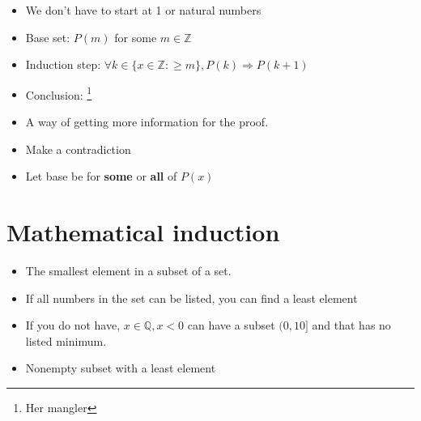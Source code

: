 \documentclass[english,10pt,a4paper]{article}
\begin{document}
\begin{theo} 
\begin{itemize}
\item We don't have to start at 1 or natural numbers
\item Base set: $P(m)$ for some $m\in \mathbb{Z}$
\item Induction step: $\forall k\in \{x \in \mathbb{Z}: \geq m \}, P(k) \Rightarrow P(k+1)$
\item Conclusion: \footnote{Her mangler}
\end{itemize}
\end{theo}


\begin{theo} 
\begin{itemize}
\item A way of getting more information for the proof.
\item Make a contradiction
\end{itemize}
\end{theo}


\begin{theo} 
\begin{itemize}
\item Let base be for \textbf{some} or \textbf{all} of $P(x)$
\end{itemize}
\end{theo}


\newpage
\section{Mathematical induction}
\begin{theo} 
\begin{itemize}
\item The smallest element in a subset of a set.
\item If all numbers in the set can be listed, you can find a least element
\item If you do not have, $x \in \mathbb{Q}, x < 0$ can have a subset $(0, 10]$ and that has no listed minimum.
\end{itemize}
\end{theo}



\begin{theo} 
\begin{itemize}
\item Nonempty subset with a least element
\end{itemize}
\end{theo}
\end{document}
